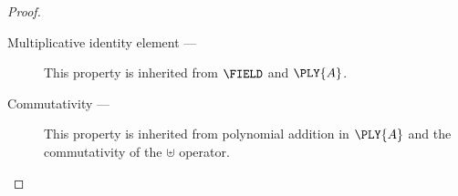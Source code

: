 \begin{proposition}
\begin{proof}
\begin{description}


    \item[Multiplicative identity element --- ]

      This property is inherited from $\FIELD$ and $\PLY{A}$.

    \item[Commutativity --- ]

      This property is inherited from polynomial addition in $\PLY{A}$
      and the commutativity of the $\uplus$ operator. 





\end{description}
\end{proof}
\end{proposition}
